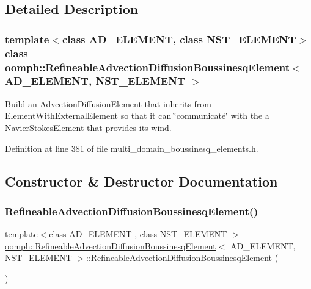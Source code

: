\subsection{Detailed Description}
\subsubsection*{template$<$class A\+D\+\_\+\+E\+L\+E\+M\+E\+NT, class N\+S\+T\+\_\+\+E\+L\+E\+M\+E\+NT$>$\newline
class oomph\+::\+Refineable\+Advection\+Diffusion\+Boussinesq\+Element$<$ A\+D\+\_\+\+E\+L\+E\+M\+E\+N\+T, N\+S\+T\+\_\+\+E\+L\+E\+M\+E\+N\+T $>$}

Build an Advection\+Diffusion\+Element that inherits from \hyperlink{classoomph_1_1ElementWithExternalElement}{Element\+With\+External\+Element} so that it can \char`\"{}communicate\char`\"{} with the a Navier\+Stokes\+Element that provides its wind. 

Definition at line 381 of file multi\+\_\+domain\+\_\+boussinesq\+\_\+elements.\+h.



\subsection{Constructor \& Destructor Documentation}
\mbox{\label{classoomph_1_1RefineableAdvectionDiffusionBoussinesqElement_a26f91df92dc910d525ec920b9d674046}} 
\subsubsection{\texorpdfstring{Refineable\+Advection\+Diffusion\+Boussinesq\+Element()}{RefineableAdvectionDiffusionBoussinesqElement()}}
{\footnotesize\ttfamily template$<$class A\+D\+\_\+\+E\+L\+E\+M\+E\+NT , class N\+S\+T\+\_\+\+E\+L\+E\+M\+E\+NT $>$ \\
\hyperlink{classoomph_1_1RefineableAdvectionDiffusionBoussinesqElement}{oomph\+::\+Refineable\+Advection\+Diffusion\+Boussinesq\+Element}$<$ A\+D\+\_\+\+E\+L\+E\+M\+E\+NT, N\+S\+T\+\_\+\+E\+L\+E\+M\+E\+NT $>$\+::\hyperlink{classoomph_1_1RefineableAdvectionDiffusionBoussinesqElement}{Refineable\+Advection\+Diffusion\+Boussinesq\+Element} (\begin{DoxyParamCaption}{ }\end{DoxyParamCaption})\hspace{0.3cm}{\ttfamily [inline]}}



